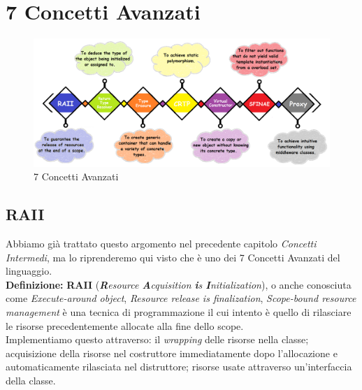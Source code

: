 

\newpage


\section{7 Concetti Avanzati}

\begin{figure}[H]
	\centering
	\includegraphics[width=1\textwidth, height=1\textheight, keepaspectratio]{./imgs/7-Advanced-C-programming-styles-and-idiom-examples-you-should-know.png}
	\caption{7 Concetti Avanzati}
	\label{fig:7-Advanced-C-programming-styles-and-idiom-examples-you-should-know}
\end{figure}

\subsection{RAII}

\textsf{\small Abbiamo già trattato questo argomento nel precedente capitolo \emph{Concetti Intermedi}, ma lo riprenderemo qui visto che è uno dei 7 Concetti Avanzati del linguaggio.} \\

\textsf{\small \textbf{Definizione: } \textbf{RAII} (\emph{\textbf{R}esource \textbf{A}cquisition \textbf{i}s \textbf{I}nitialization}), o anche conosciuta come \emph{Execute-around object}, \emph{Resource release is finalization}, \emph{Scope-bound resource management} è una tecnica di programmazione il cui intento è quello di rilasciare le risorse precedentemente allocate alla fine dello scope. } \\

\textsf{\small Implementiamo questo attraverso: il \emph{wrapping} delle risorse nella classe; acquisizione della risorse nel costruttore immediatamente dopo l'allocazione e automaticamente rilasciata nel distruttore; risorse usate attraverso un'interfaccia della classe.} \\

